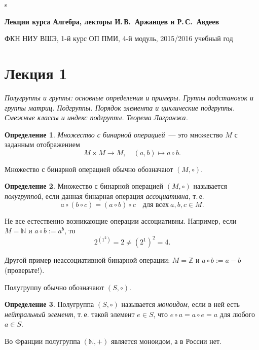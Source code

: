 \documentclass[a4paper,10pt]{amsart}
\def\ZZ{{\mathbb Z}}%
\def\NN{{\mathbb N}}%
\theoremstyle{definition}
\newtheorem{definition}{Определение}
\theoremstyle{remark}
\begin{document}
	\sloppy
	s\thispagestyle{empty}
	\centerline{\large \bf Лекции курса \guillemotleft
		Алгебра\guillemotright{}, лекторы И.\,В.~Аржанцев и Р.\,С.~Авдеев}

\smallskip

\centerline{\large ФКН НИУ ВШЭ, 1-й курс ОП ПМИ, 4-й модуль,
2015/2016 учебный год}


\tableofcontents

\newpage

\section*{Лекция 1}


\medskip

{\it Полугруппы и группы: основные определения и примеры. Группы
подстановок и группы матриц. Подгруппы. Порядок элемента и
циклические подгруппы. Смежные классы и индекс подгруппы. Теорема
Лагранжа.}

\medskip

\begin{definition}
{\it Множество с бинарной операцией}~--- это множество $M$ с
заданным отображением
$$
M\times M \to M, \quad (a,b) \mapsto a\circ b.
$$
\end{definition}

Множество с бинарной операцией обычно обозначают $(M,\circ)$.

\begin{definition}
Множество с бинарной операцией $(M,\circ)$ называется {\it
полугруппой}, если данная бинарная операция {\it ассоциативна},
т.\,е.
$$
a\circ (b \circ c) = (a\circ b)\circ c \quad \text{для всех} \ a,b,c\in M.
$$
\end{definition}

Не все естественно возникающие операции ассоциативны. Например, если
$M=\NN$ и $a\circ b:=a^b$, то
$$
2^{\left(1^2\right)}=2\ne (2^1)^2=4.
$$

Другой пример неассоциативной бинарной операции: $M = \ZZ$ и $a
\circ b := a - b$ (проверьте!).

Полугруппу обычно обозначают $(S,\circ)$.

\begin{definition}
Полугруппа $(S,\circ)$ называется {\it моноидом}, если в ней есть
{\it нейтральный элемент}, т.\,е. такой элемент $e\in S$, что
$e\circ a=a\circ e=a$ для любого $a\in S$.
\end{definition}

Во Франции полугруппа $(\NN,+)$ является моноидом, а в России нет.
\end{document}
